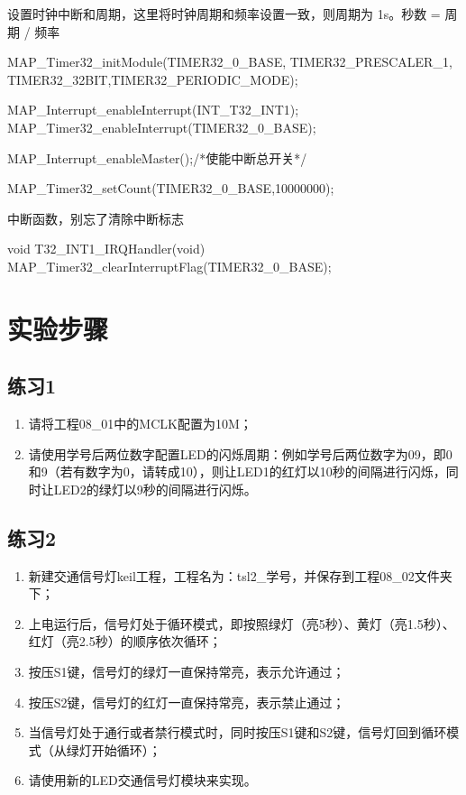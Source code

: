 \documentclass[a4paper,10pt,UTF8]{paper}
\numberwithin{equation}{section}
\numberwithin{figure}{section}
\begin{document}
设置时钟中断和周期，这里将时钟周期和频率设置一致，则周期为 1s。秒数 = 周期 / 频率

\begin{ccode}
    MAP_Timer32_initModule(TIMER32_0_BASE, TIMER32_PRESCALER_1, 
    TIMER32_32BIT,TIMER32_PERIODIC_MODE);
    
    MAP_Interrupt_enableInterrupt(INT_T32_INT1);    
    MAP_Timer32_enableInterrupt(TIMER32_0_BASE);
    
    MAP_Interrupt_enableMaster();/*使能中断总开关*/
    
    MAP_Timer32_setCount(TIMER32_0_BASE,10000000);
\end{ccode}

中断函数，别忘了清除中断标志

\begin{ccode}
    void T32_INT1_IRQHandler(void)
    {
        MAP_Timer32_clearInterruptFlag(TIMER32_0_BASE); 
    }
\end{ccode}

\section{实验步骤}

\subsection{练习1}

\begin{enumerate}
    \item 请将工程08\_01中的MCLK配置为10M；
    \item 请使用学号后两位数字配置LED的闪烁周期：例如学号后两位数字为09，即0和9（若有数字为0，请转成10），则让LED1的红灯以10秒的间隔进行闪烁，同时让LED2的绿灯以9秒的间隔进行闪烁。
\end{enumerate}


\subsection{练习2}

\begin{enumerate}
    \item 新建交通信号灯keil工程，工程名为：tsl2\_学号，并保存到工程08\_02文件夹下；
    \item 上电运行后，信号灯处于循环模式，即按照绿灯（亮5秒）、黄灯（亮1.5秒）、红灯（亮2.5秒）的顺序依次循环；
    \item 按压S1键，信号灯的绿灯一直保持常亮，表示允许通过；
    \item 按压S2键，信号灯的红灯一直保持常亮，表示禁止通过；
    \item 当信号灯处于通行或者禁行模式时，同时按压S1键和S2键，信号灯回到循环模式（从绿灯开始循环）；
    \item 请使用新的LED交通信号灯模块来实现。
\end{enumerate}
\end{document}
